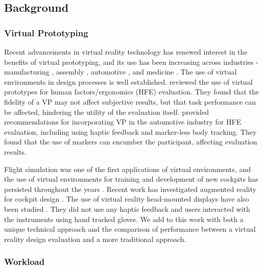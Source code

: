\subsection{Background}

\subsubsection{Virtual Prototyping}

Recent advancements in virtual reality technology has renewed interest in the benefits of virtual prototyping, and its use has been increasing across industries - manufacturing \citep{choi_virtual_2015}, assembly \citep{pontonnier_designing_2014}, automotive \citep{bordegoni_mixed_2012,lawson_future_2016}, and medicine \citep{nagendran_virtual_2013}.
The use of virtual environments in design processes is well established.
\citet{aromaa_suitability_2016} reviewed the use of virtual prototypes for human factors/ergonomics (HFE) evaluation.
They found that the fidelity of a VP may not affect subjective results, but that task performance can be affected, hindering the utility of the evaluation itself.
\citet{lawson_future_2016} provided recommendations for incorporating VP in the automotive industry for HFE evaluation, including using haptic feedback and marker-less body tracking.
They found that the use of markers can encumber the participant, affecting evaluation results.

Flight simulation was one of the first applications of virtual environments, and the use of virtual environments for training and development of new cockpits has persisted throughout the years \citep{hancock_human_2008}.
Recent work has investigated augmented reality for cockpit design \citep{wan_mrstudio:_2011}.
The use of virtual reality head-mounted displays have also been studied \citep{yavrucuk_low_2011,aslandere_virtual_2015}.
They did not use any haptic feedback and users interacted with the instruments using hand tracked gloves.
We add to this work with both a unique technical approach and the comparison of performance between a virtual reality design evaluation and a more traditional approach.

\subsubsection{Workload}

